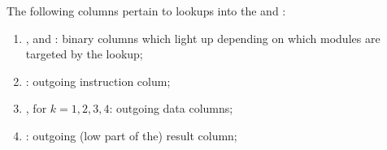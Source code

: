 The following columns pertain to lookups into the \wcpMod{} and \addMod{}: 
\begin{enumerate}[resume]
	\item \wcpFlag{}, \addFlag{} and \modFlag{}:
		binary columns which light up depending on which modules are targeted by the lookup;
	\item \outgoingInst{}:
		outgoing instruction colum;
	\item {}, for $k = 1, 2, 3, 4$:
		outgoing data columns;
	\item \outgoingResLo{}:
		outgoing (low part of the) result column;
\end{enumerate}
